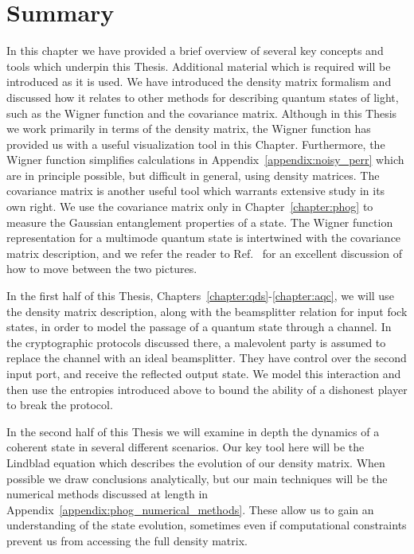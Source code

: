\FloatBarrier
\section{Summary}



In this chapter we have provided a brief overview of several key concepts and tools which underpin this Thesis. Additional material which is required will be introduced as it is used. We have introduced the density matrix formalism and discussed how it relates to other methods for describing quantum states of light, such as the Wigner function and the covariance matrix. Although in this Thesis we work primarily in terms of the density matrix, the Wigner function has provided us with a useful visualization tool in this Chapter. Furthermore, the Wigner function simplifies calculations in Appendix~\ref{appendix:noisy_perr} which are in principle possible, but difficult in general, using density matrices. The covariance matrix is another useful tool which warrants extensive study in its own right. We use the covariance matrix only in Chapter~\ref{chapter:phog} to measure the Gaussian entanglement properties of a state. The Wigner function representation for a multimode quantum state is intertwined with the covariance matrix description, and we refer the reader to Ref.~\cite{Serafini2017} for an excellent discussion of how to move between the two pictures.

In the first half of this Thesis, Chapters~\ref{chapter:qds}-\ref{chapter:aqc}, we will use the density matrix description, along with the beamsplitter relation for input fock states, in order to model the passage of a quantum state through a channel. In the cryptographic protocols discussed there, a malevolent party is assumed to replace the channel with an ideal beamsplitter. They have control over the second input port, and receive the reflected output state. We model this interaction and then use the entropies introduced above to bound the ability of a dishonest player to break the protocol.

In the second half of this Thesis we will examine in depth the dynamics of a coherent state in several different scenarios. Our key tool here will be the Lindblad equation which describes the evolution of our density matrix. When possible we draw conclusions analytically, but our main techniques will be the numerical methods discussed at length in Appendix~\ref{appendix:phog_numerical_methods}. These allow us to gain an understanding of the state evolution, sometimes even if computational constraints prevent us from accessing the full density matrix. 







